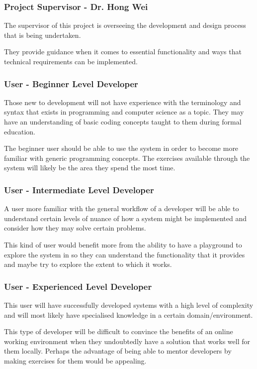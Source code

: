 \subsubsection{Project Supervisor - Dr. Hong Wei}
The supervisor of this project is overseeing the development and design process that is being undertaken. 

They provide guidance when it comes to essential functionality and ways that technical requirements can be implemented.

\subsubsection{User - Beginner Level Developer}
Those new to development will not have experience with the terminology and syntax that exists in programming and computer science as a topic. They may have an understanding of basic coding concepts taught to them during formal education.

The beginner user should be able to use the system in order to become more familiar with generic programming concepts. The exercises available through the system will likely be the area they spend the most time.

\subsubsection{User - Intermediate Level Developer}
A user more familiar with the general workflow of a developer will be able to understand certain levels of nuance of how a system might be implemented and consider how they may solve certain problems.

This kind of user would benefit more from the ability to have a playground to explore the system in so they can understand the functionality that it provides and maybe try to explore the extent to which it works.

\subsubsection{User - Experienced Level Developer}
This user will have successfully developed systems with a high level of complexity and will most likely have specialised knowledge in a certain domain/environment.

This type of developer will be difficult to convince the benefits of an online working environment when they undoubtedly have a solution that works well for them locally. Perhaps the advantage of being able to mentor developers by making exercises for them would be appealing.

